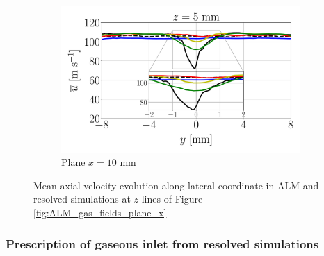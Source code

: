 \begin{figure}[ht]
\begin{subfigure}[b]{1.0\textwidth}
   \includegraphics[scale=0.24]{./part2_developments/figures_ch6_lagrangian_JICF/gas_field_initial_conditions/ALM_line_x10_z05p0_ux_mean_along_y}
   \vspace*{-0.1in}
	\caption{Plane $x = 10$ mm}
\end{subfigure}
   \caption{Mean axial velocity evolution along lateral coordinate in ALM and resolved simulations at $z$ lines of Figure \ref{fig:ALM_gas_fields_plane_x}}
\label{fig:JICF_ALM_lines_iso-x_along_y_ux_mean}
\end{figure}

\clearpage


\subsubsection*{Prescription of gaseous inlet from resolved simulations }



